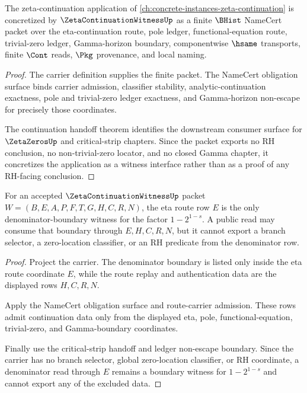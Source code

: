 \begin{theorem}
\label{thm:zeta-continuation-witness-vision-concretization}
The zeta-continuation application of \autoref{ch:concrete-instances-zeta-continuation} is concretized by $\ZetaContinuationWitnessUp$ as a finite $\BHist$ NameCert packet over the eta-continuation route, pole ledger, functional-equation route, trivial-zero ledger, Gamma-horizon boundary, componentwise $\hsame$ transports, finite $\Cont$ reads, $\Pkg$ provenance, and local naming.
\end{theorem}
\begin{proof}
The carrier definition supplies the finite packet. The NameCert obligation surface binds carrier admission, classifier stability, analytic-continuation exactness, pole and trivial-zero ledger exactness, and Gamma-horizon non-escape for precisely those coordinates.

The continuation handoff theorem identifies the downstream consumer surface for $\ZetaZerosUp$ and critical-strip chapters. Since the packet exports no RH conclusion, no non-trivial-zero locator, and no closed Gamma chapter, it concretizes the application as a witness interface rather than as a proof of any RH-facing conclusion.
\end{proof}

\begin{theorem}
\label{thm:zeta-continuation-witness-eta-denominator-boundary}
For an accepted $\ZetaContinuationWitnessUp$ packet $W=(B,E,A,P,F,T,G,H,C,R,N)$, the eta route row $E$ is the only denominator-boundary witness for the factor $1-2^{1-s}$. A public read may consume that boundary through $E,H,C,R,N$, but it cannot export a branch selector, a zero-location classifier, or an RH predicate from the denominator row.
\end{theorem}
\begin{proof}
Project the carrier. The denominator boundary is listed only inside the eta route coordinate $E$, while the route replay and authentication data are the displayed rows $H,C,R,N$.

Apply the NameCert obligation surface and route-carrier admission. These rows admit continuation data only from the displayed eta, pole, functional-equation, trivial-zero, and Gamma-boundary coordinates.

Finally use the critical-strip handoff and ledger non-escape boundary. Since the carrier has no branch selector, global zero-location classifier, or RH coordinate, a denominator read through $E$ remains a boundary witness for $1-2^{1-s}$ and cannot export any of the excluded data.
\end{proof}

